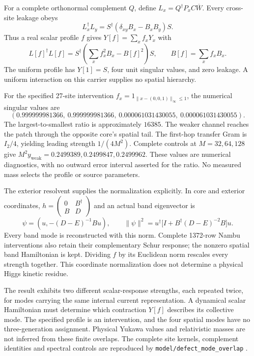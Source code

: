 For a complete orthonormal complement $Q$, define
$L_x=Q^\dagger P_xC\overline W$. Every cross-site leakage obeys
\[
 L_x^\dagger L_y
   =S^\dagger(\delta_{xy}B_x-B_xB_y)S.
\]
Thus a real scalar profile $f$ gives $Y[f]=\sum_x f_xY_x$ with
\[
 L[f]^\dagger L[f]
  =S^\dagger\left(\sum_x f_x^2B_x-B[f]^2\right)S,
 \qquad B[f]=\sum_x f_xB_x.
\]
The uniform profile has $Y[1]=S$, four unit singular values, and zero
leakage. A uniform interaction on this carrier supplies no spatial
hierarchy.

For the specified 27-site intervention
$f_x=1_{\|x-(0,0,1)\|_\infty\le1}$, the numerical singular values are
\[
 (0.999999981366,\ 0.999999981366,\
  0.000061031430055,\ 0.000061031430055).
\]
The largest-to-smallest ratio is approximately $16385$. The weaker
channel reaches the patch through the opposite core's spatial tail.
The first-hop transfer Gram is $I_2/4$, yielding leading strength
$1/(4M^2)$. Complete controls at $M=32,64,128$ give
$M^2y_{\mathrm{weak}}=0.2499389,0.2499847,0.2499962$.
These values are numerical diagnostics, with no outward error interval
asserted for the ratio. No measured mass selects the profile or source
parameters.

The exterior resolvent supplies the normalization explicitly. In core and
exterior coordinates, $h=\left(\begin{smallmatrix}0&B^\dagger\\B&D\end{smallmatrix}\right)$
and an actual band eigenvector is
\[
 \psi=(u,-(D-E)^{-1}Bu),\qquad
 \|\psi\|^2=u^\dagger\bigl[I+B^\dagger(D-E)^{-2}B\bigr]u.
\]
Every band mode is reconstructed with this norm. Complete 1372-row Nambu
interventions also retain their complementary Schur response; the
nonzero spatial band Hamiltonian is kept. Dividing $f$ by its Euclidean
norm rescales every strength together. This coordinate normalization does
not determine a physical Higgs kinetic residue.

The result exhibits two different scalar-response strengths, each repeated
twice, for modes carrying the same internal current representation.
A dynamical scalar Hamiltonian must determine which contraction $Y[f]$
describes its collective mode. The specified profile is an intervention,
and the four spatial modes have no three-generation assignment. Physical
Yukawa values and relativistic masses are not inferred from these finite
overlaps. The complete site kernels, complement identities and spectral
controls are reproduced by \texttt{model/defect\_mode\_overlap} \cite{ophrepo}.

